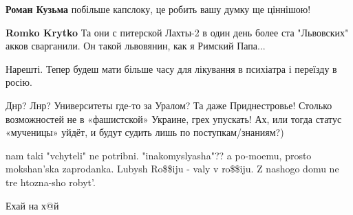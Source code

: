 \begin{itemize}
\begin{itemize}
\textbf{Роман Кузьма} побільше капслоку, це робить вашу думку ще ціннішою!

 
\textbf{Romko Krytko} Та они с питерской Лахты-2 в один день более ста "Львовских" акков сварганили. Он такой львовянин, как я Римский Папа...
\end{itemize}

 
Нарешті. Тепер будеш мати більше часу для лікування в психіатра і переїзду в росію.

 
Днр? Лнр? Университеты где-то за Уралом? Та даже Приднестровье! Столько возможностей не в «фашистской» Украине, грех упускать! Ах, или тогда статус «мученицы» уйдёт, и будут судить лишь по поступкам/знаниям?)

 
nam taki "vchyteli" ne potribni. "inakomyslyasha"?? a po-moemu, prosto
mokshan'ska zaprodanka. Lubysh Ro\$\$iju - valy v ro\$\$iju. Z nashogo domu ne
tre htozna-sho robyt'.


 
Ехай на х@й

 

\end{itemize}
